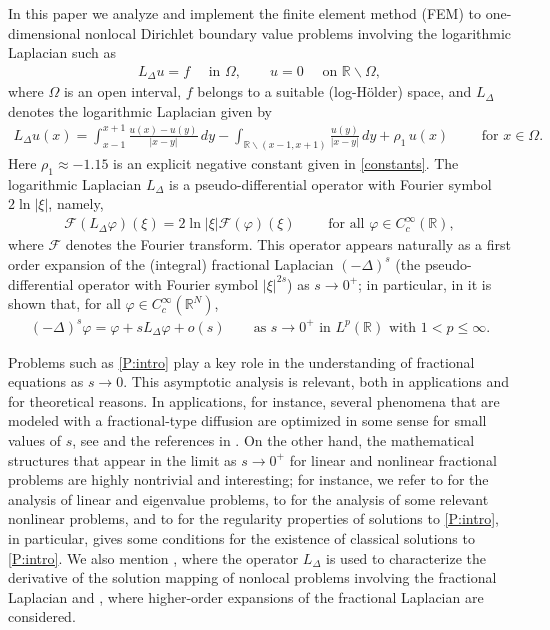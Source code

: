\documentclass[10 pt]{article}
\numberwithin{equation}{section}
\def\R{\mathbb{R}}
\begin{document}
In this paper we analyze and implement the finite element method (FEM) to one-dimensional nonlocal Dirichlet boundary value problems involving the logarithmic Laplacian such as
\begin{align}\label{P:intro}
    L_\Delta u = f \quad \text{ in }\Omega,\qquad u=0\quad \text{ on }\R\backslash \Omega,
\end{align}
where $\Omega$ is an open interval, $f$ belongs to a suitable (log-Hölder) space, and $L_\Delta$ denotes the logarithmic Laplacian given by
\begin{align}\label{LL}
     L_\Delta u(x)
     =
     \int_{x-1}^{x+1}\frac{u(x)-u(y)}{|x-y|}\, dy
     -\int_{\R\backslash(x-1,x+1)}\frac{u(y)}{|x-y|}\, dy
     +\rho_1\, u(x)\qquad \text{ for }x\in \Omega.
 \end{align}
 Here $\rho_1\approx-1.15$ is an explicit negative constant given in \eqref{constants}. The logarithmic Laplacian $L_\Delta$ is a pseudo-differential operator with Fourier symbol $2\ln|\xi|$, namely,
\begin{align*}
{\mathcal F}(L_\Delta \varphi)(\xi)=2\ln|\xi| {\mathcal F}(\varphi)(\xi)\qquad \text{ for all }\varphi\in C^\infty_c(\R),
\end{align*}
where ${\mathcal F}$ denotes the Fourier transform.  This operator appears naturally as a first order expansion of the (integral) fractional Laplacian $(-\Delta)^s$ (the pseudo-differential operator with Fourier symbol $|\xi|^{2s}$) as $s\to 0^+$; in particular, in \cite[Theorem 1.1]{CW19} it is shown that, for all $\varphi\in C^\infty_c(\R^N)$,
\begin{align}\label{intro:exp}
(-\Delta)^s\varphi = \varphi + sL_\Delta \varphi + o(s)\qquad \text{as $s\to 0^+$ in }L^p(\R) \text{ with }1<p\leq \infty.
\end{align}

 Problems such as \eqref{P:intro} play a key role in the understanding of fractional equations as $s\to 0$. This asymptotic analysis is relevant, both in applications and for theoretical reasons.  In applications, for instance, several phenomena that are modeled with a fractional-type diffusion are optimized in some sense for small values of $s$, see \cite{Caffarelli17} and the references in \cite{HSS22}.  On the other hand,  the mathematical structures that appear in the limit as $s\to 0^+$ for linear and nonlinear fractional problems are highly nontrivial and interesting; for instance, we refer to \cite{CW19,LW21,FJW22} for the analysis of linear and eigenvalue problems, to \cite{AS22,HSS22} for the analysis of some relevant nonlinear problems, and to \cite{CS22} for the regularity properties of solutions to \eqref{P:intro}, in particular, \cite[Theorem 1.1]{CS22} gives some conditions for the existence of classical solutions to \eqref{P:intro}.  We also mention \cite{JSW20}, where the operator $L_\Delta$ is used to characterize the derivative of the solution mapping of nonlocal problems involving the fractional Laplacian and \cite{chen2023taylor}, where higher-order expansions of the fractional Laplacian are considered.
\end{document}
